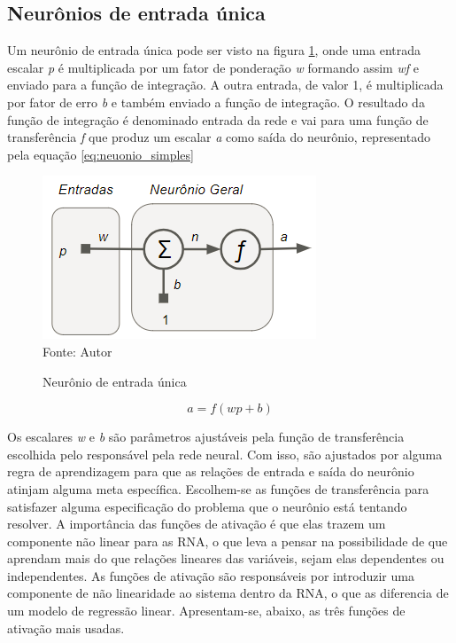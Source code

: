 \documentclass[
	12pt,				%
    oneside,			%
	a4paper,			%
	english,			%
	french,				%
	spanish,			%
	brazil,				%
	]{abntex2}
\begin{document}
\subsection {Neurônios de entrada única}

Um neurônio de entrada única pode ser visto na figura \ref{fig:Neurônio_geral1}, onde uma entrada escalar \textit{p} é multiplicada por um fator de ponderação \textit{w} formando assim \textit{wf} e enviado para a função de integração. A outra entrada, de valor 1, é multiplicada por fator de erro \textit{b} e também enviado a função de integração. O resultado da função de integração é denominado entrada da rede e vai para uma função de transferência \textit{f} que produz um escalar \textit{a} como saída do neurônio, representado pela equação \ref{eq:neuonio_simples}

\begin{figure}[H]
    \centering
    \caption{Neurônio de entrada única}
    \includegraphics[scale=1]{Neuronio_geral1}\\
    Fonte: Autor\hfill
    \label{fig:Neurônio_geral1}
\end{figure}

  \begin{equation}
    a = {f(wp+b)}
    \label{eq:neuonio_simples}
  \end{equation}


 Os escalares \textit{w} e \textit{b} são parâmetros ajustáveis pela função de transferência escolhida pelo responsável pela rede neural. Com isso, são ajustados por alguma regra de aprendizagem para que as relações de entrada e saída do neurônio atinjam alguma meta específica. Escolhem-se as funções de transferência para satisfazer alguma especificação do problema que o neurônio está tentando resolver. A importância das funções de ativação é que elas trazem um componente não linear para as RNA, o que leva a pensar na possibilidade de que aprendam mais do que relações lineares das variáveis, sejam elas dependentes ou independentes. As funções de ativação são responsáveis por introduzir uma componente de não linearidade ao sistema dentro da RNA, o que as diferencia de um modelo de regressão linear. Apresentam-se, abaixo, as três funções de ativação mais usadas.
\end{document}
